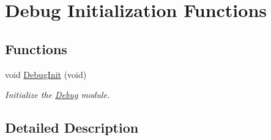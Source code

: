 \hypertarget{group___debug___exported___functions___group1}{}\section{Debug Initialization Functions}
\label{group___debug___exported___functions___group1}
\subsection*{Functions}
\begin{DoxyCompactItemize}
\item 
void \hyperlink{group___debug___exported___functions___group1_gaba4ba4d9ae40dd8249c35d07ed2a523a}{Debug\+Init} (void)\hypertarget{group___debug___exported___functions___group1_gaba4ba4d9ae40dd8249c35d07ed2a523a}{}\label{group___debug___exported___functions___group1_gaba4ba4d9ae40dd8249c35d07ed2a523a}

\begin{DoxyCompactList}\small\item\em Initialize the \hyperlink{group___debug}{Debug} module. \end{DoxyCompactList}\end{DoxyCompactItemize}


\subsection{Detailed Description}
